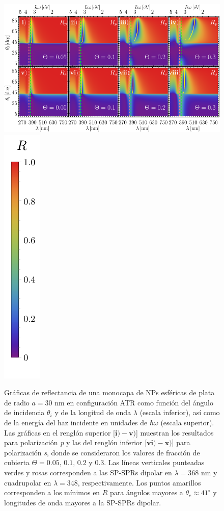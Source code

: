 \begin{figure}[h!]\centering
\includegraphics[width = .75\linewidth]{2-Resultados/figs/7-AgThetaVar/0-2D_Grid}%
\includegraphics[scale=.85, trim={00 -5 00 00}, clip]{2-Resultados/figs/0-RBar_v}\vspace*{-.5em}
	\caption{Gráficas de reflectancia de una monocapa de NPs esféricas de plata de radio $a=30$ nm en configuración ATR como función del ángulo de incidencia $\theta_i$ y de la longitud de onda $\lambda$ (escala inferior), así como de la energía del haz incidente en unidades de $\hbar\omega$ (escala superior).  Las gráficas   en el renglón superior [$\mathbf{i)-v)}$] muestran los resultados para  polarización \emph{p} y las del renglón inferior  [$\mathbf{vi)-x)}$]  para polarización  \emph{s}, donde se consideraron los valores de fracción de cubierta $\Theta = 0.05,\,0.1,\,0.2$ y $0.3$.  Las líneas verticales punteadas verdes y rosas corresponden a las SP-SPRs dipolar en $\lambda=368$ nm y  cuadrupolar en $\lambda=348$, respectivamente.  Los puntos amarillos corresponden a los mínimos en $R$ para ángulos mayores a $\theta_c\approx 41^\circ$ y longitudes de onda mayores a la SP-SPRs dipolar.
}	\label{fig:Ag-R-Theta}	
	\end{figure}	


